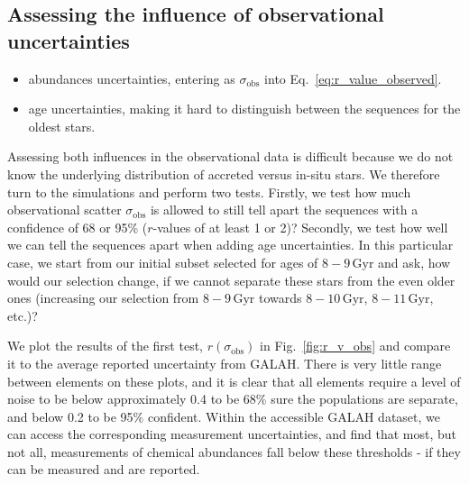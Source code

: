 \documentclass[fleqn,usenatbib]{mnras}
\begin{document}


\subsection{Assessing the influence of observational uncertainties}

\begin{itemize}
    \item abundances uncertainties, entering as $\sigma_{\text{obs}}$ into Eq.~\ref{eq:r_value_observed}.
    \item age uncertainties, making it hard to distinguish between the sequences for the oldest stars.
\end{itemize}

Assessing both influences in the observational data is difficult because we do not know the underlying distribution of accreted versus in-situ stars. We therefore turn to the simulations and perform two tests. Firstly, we test how much observational scatter $\sigma_{\text{obs}}$ is allowed to still tell apart the sequences with a confidence of 68 or 95\% ($r$-values of at least 1 or 2)? Secondly, we test how well we can tell the sequences apart when adding age uncertainties. In this particular case, we start from our initial subset selected for ages of $8-9\,\mathrm{Gyr}$ and ask, how would our selection change, if we cannot separate these stars from the even older ones (increasing our selection from $8-9\,\mathrm{Gyr}$ towards $8-10\,\mathrm{Gyr}$, $8-11\,\mathrm{Gyr}$, etc.)?

We plot the results of the first test, $r (\sigma_\text{obs})$ in Fig.~\ref{fig:r_v_obs} and compare it to the average reported uncertainty from GALAH. There is very little range between elements on these plots, and it is clear that all elements require a level of noise to be below approximately 0.4 to be 68\% sure the populations are separate, and below 0.2 to be 95\% confident. Within the accessible GALAH dataset, we can access the corresponding measurement uncertainties, and find that most, but not all, measurements of chemical abundances fall below these thresholds - if they can be measured and are reported.
\end{document}

